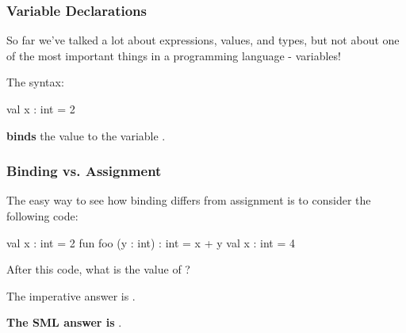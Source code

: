 \documentclass[aspectratio=169]{beamer}
\begin{document}
\begin{frame}[fragile]
  \frametitle{Variable Declarations}

  So far we've talked a lot about expressions, values, and types, but not about one of the
  most important things in a programming language - variables!

  \vspace{\fill}

  The syntax: 

  \begin{codeblock}
    val x : int = 2
  \end{codeblock}

  \textbf{binds} the value  to the variable . 

  \vspace{\fill}


  \vspace{\fill}

\end{frame}

\begin{frame}[fragile]
  \frametitle{Binding vs. Assignment}

  The easy way to see how binding differs from assignment is to consider 
  the following code:

  \vspace{\fill}

  \begin{codeblock}
    val x : int = 2 
    fun foo (y : int) : int = x + y
    val x : int = 4 
  \end{codeblock}

  \vspace{\fill}

  After this code, what is the value of ?
  
  \vspace{\fill}

  The imperative answer is . 

  \vspace{\fill}

  \textbf{The SML answer is }.
\end{frame}
\end{document}
